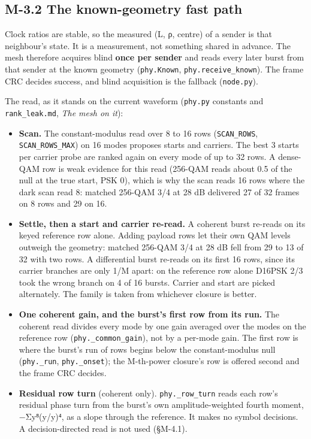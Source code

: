 \documentclass[10pt,letterpaper,twocolumn]{article}
\providecommand{\tightlist}{\setlength{\itemsep}{0pt}\setlength{\parskip}{0pt}}
\begin{document}
\subsection{M-3.2 The known-geometry fast path}\label{m-32-the-known-geometry-fast-path}

Clock ratios are stable, so the measured (L, ρ, centre) of a sender is that neighbour's state. It is a measurement, not something shared in advance. The mesh therefore acquires blind \textbf{once per sender} and reads every later burst from that sender at the known geometry (\texttt{phy.\allowbreak{}Known}, \texttt{phy.\allowbreak{}receive\_\allowbreak{}known}). The frame CRC decides success, and blind acquisition is the fallback (\texttt{node.\allowbreak{}py}).

The read, as it stands on the current waveform (\texttt{phy.\allowbreak{}py} constants and \texttt{rank\_\allowbreak{}leak.\allowbreak{}md}, \emph{The mesh on it}):

\begin{itemize}
\tightlist
\item
  \textbf{Scan.} The constant-modulus read over 8 to 16 rows (\texttt{SCAN\_\allowbreak{}ROWS}, \texttt{SCAN\_\allowbreak{}ROWS\_\allowbreak{}MAX}) on 16 modes proposes starts and carriers. The best 3 starts per carrier probe are ranked again on every mode of up to 32 rows. A dense-QAM row is weak evidence for this read (256-QAM reads about 0.5 of the null at the true start, PSK 0), which is why the scan reads 16 rows where the dark scan read 8: matched 256-QAM 3/4 at 28 dB delivered 27 of 32 frames on 8 rows and 29 on 16.
\item
  \textbf{Settle, then a start and carrier re-read.} A coherent burst re-reads on its keyed reference row alone. Adding payload rows let their own QAM levels outweigh the geometry: matched 256-QAM 3/4 at 28 dB fell from 29 to 13 of 32 with two rows. A differential burst re-reads on its first 16 rows, since its carrier branches are only 1/M apart: on the reference row alone D16PSK 2/3 took the wrong branch on 4 of 16 bursts. Carrier and start are picked alternately. The family is taken from whichever closure is better.
\item
  \textbf{One coherent gain, and the burst's first row from its run.} The coherent read divides every mode by one gain averaged over the modes on the reference row (\texttt{phy.\allowbreak{}\_\allowbreak{}common\_\allowbreak{}gain}), not by a per-mode gain. The first row is where the burst's run of rows begins below the constant-modulus null (\texttt{phy.\allowbreak{}\_\allowbreak{}run}, \texttt{phy.\allowbreak{}\_\allowbreak{}onset}); the M-th-power closure's row is offered second and the frame CRC decides.
\item
  \textbf{Residual row turn} (coherent only). \texttt{phy.\allowbreak{}\_\allowbreak{}row\_\allowbreak{}turn} reads each row's residual phase turn from the burst's own amplitude-weighted fourth moment, −Σ\textbar y\textbar⁸(y/\textbar y\textbar)⁴, as a slope through the reference. It makes no symbol decisions. A decision-directed read is not used (§M-4.1).
\end{itemize}
\end{document}
